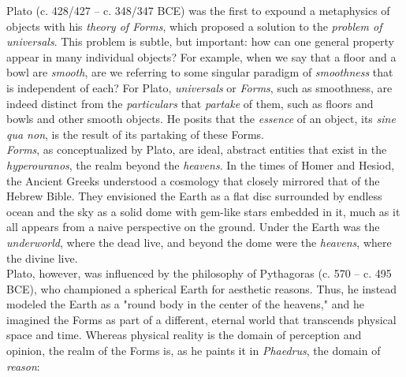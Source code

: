
Plato (c. 428/427 -- c. 348/347 BCE) was the first to expound a metaphysics of objects with his \textit{theory of Forms}, which proposed a solution to the \textit{problem of universals}. This problem is subtle, but important: how can one general property appear in many individual objects? For example, when we say that a floor and a bowl are \textit{smooth}, are we referring to some singular paradigm of \textit{smoothness} that is independent of each? For Plato, \textit{universals} or \textit{Forms}, such as smoothness, are indeed distinct from the \textit{particulars} that \textit{partake} of them, such as floors and bowls and other smooth objects. He posits that the \textit{essence} of an object, its \textit{sine qua non}, is the result of its partaking of these Forms. \\

\textit{Forms}, as conceptualized by Plato, are ideal, abstract entities that exist in the \textit{hyperouranos}, the realm beyond the \textit{heavens}. In the times of Homer and Hesiod, the Ancient Greeks understood a cosmology that closely mirrored that of the Hebrew Bible. They envisioned the Earth as a flat disc surrounded by endless ocean and the sky as a solid dome with gem-like stars embedded in it, much as it all appears from a naive perspective on the ground. Under the Earth was the \textit{underworld}, where the dead live, and beyond the dome were the \textit{heavens}, where the divine live. \\


Plato, however, was influenced by the philosophy of Pythagoras (c. 570 -- c. 495 BCE), who championed a spherical Earth for aesthetic reasons. Thus, he instead modeled the Earth as a "round body in the center of the heavens," and he imagined the Forms as part of a different, eternal world that transcends physical space and time. Whereas physical reality is the domain of perception and opinion, the realm of the Forms is, as he paints it in \textit{Phaedrus}, the domain of \textit{reason}: \\

